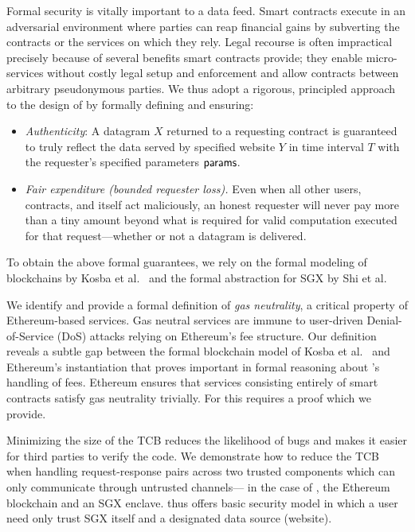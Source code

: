 \vspace{1ex}
Formal security is vitally important to a data feed.
Smart contracts execute in an adversarial environment where parties can reap financial gains by subverting the contracts or the services on which they rely.
Legal recourse is often impractical precisely because of several benefits smart contracts provide;
they enable micro-services without costly legal setup and enforcement and allow contracts between arbitrary pseudonymous parties.
We thus adopt a rigorous, principled approach to the design of \tcs by formally defining and ensuring:

\begin{itemize}[leftmargin=5mm]
\item
  \setlength{\itemsep}{2pt}
  \setlength{\parskip}{0pt}
  \setlength{\parsep}{0pt}
{\it Authenticity}: A datagram $X$ returned
to a requesting contract is guaranteed
to truly reflect the data served by specified website $Y$ in time interval $T$ with the requester's specified parameters ${\sf params}$.
\item
{\it Fair expenditure (bounded requester loss).}
Even when all other users, contracts, and \tc itself act maliciously,
an honest requester will never pay more than a tiny amount beyond what is required for valid computation executed for that request---whether or not a datagram is delivered.
\end{itemize}

To obtain the above formal guarantees, we rely on the formal modeling
of blockchains by Kosba et al.~\cite{hawk} and the formal abstraction for SGX by Shi et al.~\cite{sgxsok}

\vspace{1ex}
We identify and provide a formal definition of \emph{gas neutrality}, a critical property of Ethereum-based services.
Gas neutral services are immune to user-driven Denial-of-Service (DoS) attacks relying on Ethereum's fee structure.
Our definition reveals a subtle gap between the formal blockchain model of Kosba et al.~\cite{hawk}
and Ethereum's instantiation that proves important in formal reasoning about \tc's handling of fees.
Ethereum ensures that services consisting entirely of smart contracts satisfy gas neutrality trivially.
For \tc this requires a proof which we provide.

\vspace{1ex}
Minimizing the size of the TCB reduces the likelihood of bugs and makes it easier for third parties to verify the code.
We demonstrate how to reduce the TCB when handling request-response pairs across two trusted components which can only communicate through untrusted channels---%
in the case of \tc, the Ethereum blockchain and an SGX enclave.
\tc thus offers basic security model in which a user need only trust SGX itself and a designated data source (website).

